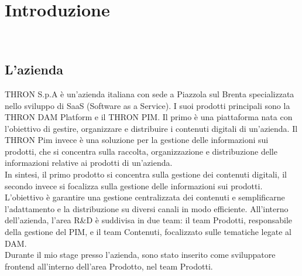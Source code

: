 \chapter{Introduzione}
\label{cap:introduzione}




\\


\section{L'azienda}

THRON S.p.A è un'azienda italiana con sede a Piazzola sul Brenta specializzata nello sviluppo di SaaS (Software as a Service).
I suoi prodotti principali sono la THRON DAM Platform e il THRON PIM. 
Il primo è una piattaforma nata con l'obiettivo di gestire, organizzare e distribuire i contenuti digitali di un'azienda.
Il THRON Pim invece è una soluzione per la gestione delle informazioni sui prodotti, che si concentra
sulla raccolta, organizzazione e distribuzione delle informazioni relative ai prodotti di un'azienda.\\
In sintesi, il primo prodotto si concentra sulla gestione dei contenuti digitali, il secondo invece
si focalizza sulla gestione delle informazioni sui prodotti.
L'obiettivo è garantire una gestione centralizzata dei contenuti e semplificarne l'adattamento e la distribuzione su diversi
canali in modo efficiente.
All'interno dell'azienda, l'area R\&D è suddivisa in due team: il team Prodotti, responsabile della gestione
del PIM, e il team Contenuti, focalizzato sulle tematiche legate al DAM.\\
Durante il mio stage presso l'azienda, sono stato inserito come sviluppatore frontend all'interno dell'area Prodotto, nel team Prodotti.

